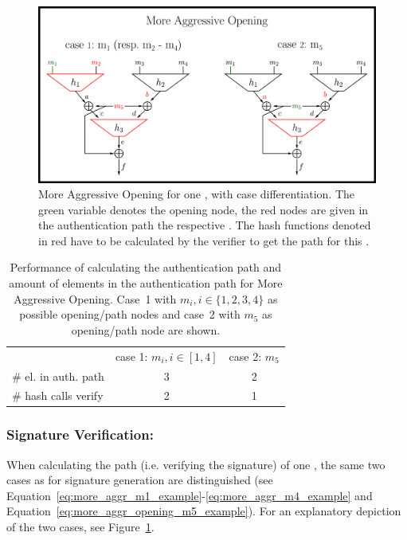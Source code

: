 \begin{figure}
\centering
\includegraphics[]{images/Methods/more_aggr_opening.png}
\caption{More Aggressive Opening for one \tfblock, with case differentiation. The green variable denotes the opening node, the red nodes are given in the authentication path the respective \tfblock. The hash functions denoted in red have to be calculated by the verifier to get the path for this \tfblock.}
\label{img:t5_more_aggr_opening}
\end{figure}

\begin{table}
\centering
\begin{tabular}{l c c} 
 \hline\noalign{\smallskip}
 \multicolumn{3}{c}{\textbf{More Aggressive Opening}} \\
 \hline\noalign{\smallskip}
 & case 1: $m_i, i \in [1,4]$ & case 2: $m_5$ \\
 \# el. in auth. path & 3 & 2 \\
 \# hash calls verify & 2 & 1 \\
 \hline
\end{tabular}
\caption{Performance of calculating the authentication path and amount of elements in the authentication path for More Aggressive Opening. Case~1 with $m_i, i \in \{1,2,3,4\}$ as possible opening/path nodes and case~2 with $m_5$ as opening/path node are shown.}
\label{table:more_aggr_opening}
\end{table}

\subsubsection{Signature Verification: \texorpdfstring{\tfblock}{T5-Block}}
When calculating the path (i.e. verifying the signature) of one \tfblock, the same two cases as for signature generation are distinguished (see Equation~\ref{eq:more_aggr_m1_example}-\ref{eq:more_aggr_m4_example} and Equation~\ref{eq:more_aggr_opening_m5_example}). For an explanatory depiction of the two cases, see Figure~\ref{img:t5_more_aggr_opening}.

